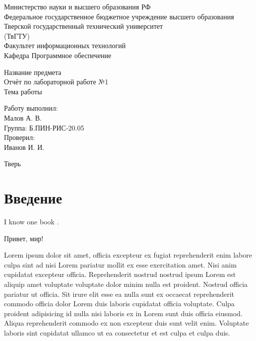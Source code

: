 \documentclass[14pt,a4paper]{extarticle}
\newcommand{\asection}[1]{
  \section*{#1}
  \addcontentsline{toc}{section}{#1}
}
\begin{document}
\begin{titlepage}
	\begin{center}
		Министерство науки и высшего образования РФ\\
		Федеральное государственное бюджетное учреждение высшего образования\\
		Тверской государственный технический университет\\
		(ТвГТУ)\\
		Факультет информационных технологий\\
		Кафедра Программное обеспечение
		\vspace{6cm}

		Название предмета\\
		Отчёт по лабораторной работе №1\\
		Тема работы
		\vspace{3cm}

		\begin{flushright}
			\begin{minipage}{0.25\textwidth}
				\begin{flushleft}

					Работу выполнил:\\
					Малов А. В. \\
					Группа: Б.ПИН-РИС-20.05\\

					Проверил:\\
					Иванов И. И.

				\end{flushleft}
			\end{minipage}
		\end{flushright}

		\vfill
		Тверь

		\the\year{}
	\end{center}
\end{titlepage}
\newpage

\tableofcontents
\newpage

\asection{Введение}

I know one book \cite{west2004}.

Привет, мир!

Lorem ipsum dolor sit amet, officia excepteur ex fugiat reprehenderit enim
labore culpa sint ad nisi Lorem pariatur mollit ex esse exercitation amet. Nisi
anim cupidatat excepteur officia. Reprehenderit nostrud nostrud ipsum Lorem est
aliquip amet voluptate voluptate dolor minim nulla est proident. Nostrud
officia pariatur ut officia. Sit irure elit esse ea nulla sunt ex occaecat
reprehenderit commodo officia dolor Lorem duis laboris cupidatat officia
voluptate. Culpa proident adipisicing id nulla nisi laboris ex in Lorem sunt
duis officia eiusmod. Aliqua reprehenderit commodo ex non excepteur duis sunt
velit enim. Voluptate laboris sint cupidatat ullamco ut ea consectetur et est
culpa et culpa duis.
\end{document}
